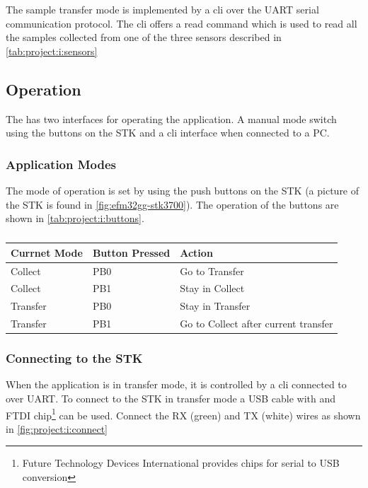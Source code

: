 The sample transfer mode is implemented by a \gls{cli} over the UART serial communication protocol.
The \gls{cli} offers a read command which is used to read all the samples collected from one of the three sensors described in \autoref{tab:project:i:sensors}

\subsection{Operation}

The {\tracker} has two interfaces for operating the application.
A manual mode switch using the buttons on the STK and a \gls{cli} interface when connected to a PC.

\subsubsection{Application Modes}
The mode of operation is set by using the push buttons on the STK (a picture of the STK is found in \autoref{fig:efm32gg-stk3700}).
The operation of the buttons are shown in \autoref{tab:project:i:buttons}.

\begin{table}[H]
  \centering
  \begin{tabular}{l|l|l}
    \textbf{Currnet Mode} & \textbf{Button Pressed} & \textbf{Action} \\
    \hline
    Collect & PB0 & Go to Transfer \\
    Collect & PB1 & Stay in Collect \\
    Transfer & PB0 & Stay in Transfer \\
    Transfer & PB1 & Go to Collect after current transfer \\
    \hline
  \end{tabular}
  \caption{}
  \label{tab:project:i:buttons}
\end{table}

\subsubsection{Connecting to the STK}
When the application is in transfer mode, it is controlled by a \gls{cli} connected to over UART.
To connect to the STK in transfer mode a USB cable with and FTDI chip\footnote{Future Technology Devices International provides chips for serial to USB conversion} can be used.
Connect the RX (green) and TX (white) wires as shown in \autoref{fig:project:i:connect}

